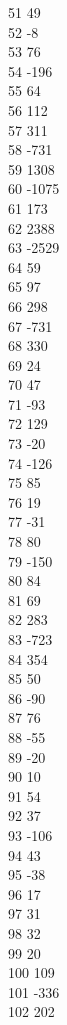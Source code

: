 { 51	49 \\
 52	-8 \\
 53	76 \\
 54	-196 \\
 55	64 \\
 56	112 \\
 57	311 \\
 58	-731 \\
 59	1308 \\
 60	-1075 \\
 61	173 \\
 62	2388 \\
 63	-2529 \\
 64	59 \\
 65	97 \\
 66	298 \\
 67	-731 \\
 68	330 \\
 69	24 \\
 70	47 \\
 71	-93 \\
 72	129 \\
 73	-20 \\
 74	-126 \\
 75	85 \\
 76	19 \\
 77	-31 \\
 78	80 \\
 79	-150 \\
 80	84 \\
 81	69 \\
 82	283 \\
 83	-723 \\
 84	354 \\
 85	50 \\
 86	-90 \\
 87	76 \\
 88	-55 \\
 89	-20 \\
 90	10 \\
 91	54 \\
 92	37 \\
 93	-106 \\
 94	43 \\
 95	-38 \\
 96	17 \\
 97	31 \\
 98	32 \\
 99	20 \\
 100	109 \\
 101	-336 \\
 102	202 \\
}
